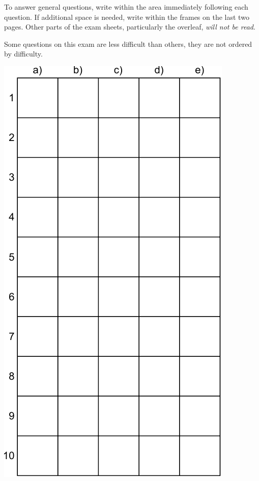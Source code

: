 \documentclass[addpoints]{exam}
\begin{document}
\begin{center}
\begin{minipage}{\textwidth}
\begin{multicols}{2}
        To answer general questions, write within the area immediately following each question. If additional space is needed, write within the frames on the last two pages. Other parts of the exam sheets, particularly the overleaf, \emph{will not be read}.
        
        Some questions on this exam are less difficult than others, they are not ordered by difficulty.

        \begin{center}
            \includegraphics[width=0.7\linewidth]{Pics/svartafla}
        \end{center}
    \end{multicols}    
    \end{minipage}

\end{center}
\end{document}
